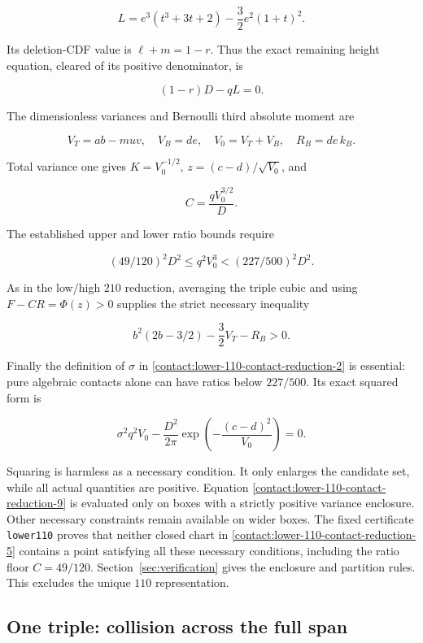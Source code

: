 \[
 L=e^3(t^3+3t+2)-\frac32e^2(1+t)^2.
\]

Its deletion-CDF value is $\ell+m=1-r$. Thus the exact remaining height
equation, cleared of its positive denominator, is

\[
 \boxed{\quad (1-r)D-qL=0.\quad}
\tag{B.13.6}\label{contact:lower-110-contact-reduction-6}
\]

The dimensionless variances and Bernoulli third absolute moment are

\[
 V_T=ab-muv,\quad V_B=de,\quad V_0=V_T+V_B,\quad R_B=de\,k_B.
\]

Total variance one gives $K=V_0^{-1/2}$, $z=(c-d)/\sqrt{V_0}$, and

\[
 C=\frac{qV_0^{3/2}}D.
\]

The established upper and lower ratio bounds require

\[
 \boxed{\quad (49/120)^2D^2\le q^2V_0^3<(227/500)^2D^2.\quad}
\tag{B.13.7}\label{contact:lower-110-contact-reduction-7}
\]

As in the low/high $210$ reduction, averaging the triple cubic and using
$F-CR=\Phi(z)>0$ supplies the strict necessary inequality

\[
 \boxed{\quad b^2(2b-3/2)-\frac32V_T-R_B>0.\quad}
\tag{B.13.8}\label{contact:lower-110-contact-reduction-8}
\]

Finally the definition of $\sigma$ in \eqref{contact:lower-110-contact-reduction-2} is essential: pure algebraic
contacts alone can have ratios below $227/500$. Its exact squared form is

\[
 \boxed{\quad
 \sigma^2 q^2 V_0
 -\frac{D^2}{2\pi}\exp\!\left(-\frac{(c-d)^2}{V_0}\right)=0.
 \quad}
\tag{B.13.9}\label{contact:lower-110-contact-reduction-9}
\]

Squaring is harmless as a necessary condition. It only enlarges the
candidate set, while all actual quantities are positive. Equation \eqref{contact:lower-110-contact-reduction-9}
is evaluated only on boxes with a strictly positive variance enclosure.
Other necessary constraints remain available on wider boxes.
The fixed certificate \texttt{lower110} proves that neither closed
chart in \eqref{contact:lower-110-contact-reduction-5} contains a point
satisfying all these necessary conditions, including the ratio floor
$C=49/120$. Section~\ref{sec:verification} gives the enclosure and
partition rules. This excludes the unique $110$ representation.
\subsection{One triple: collision across the full span}\label{contact:one-triple-bernoulli-collision-211}



